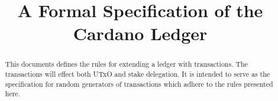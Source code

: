 
\title{A Formal Specification of the Cardano Ledger}

\author{}


\maketitle

\begin{abstract}
This documents defines the rules for extending a ledger with transactions.
The transactions will effect both UTxO and stake delegation.
It is intended to serve as the specification for random generators of transactions
which adhere to the rules presented here.
\end{abstract}
